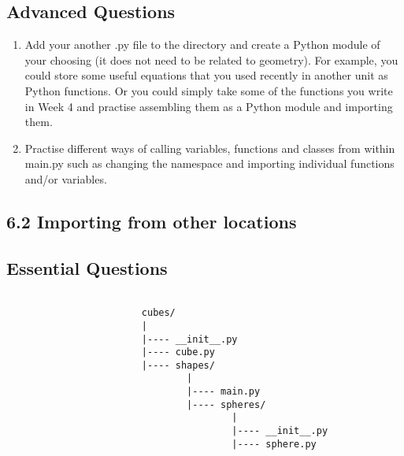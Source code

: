 \documentclass[11pt]{report}
\begin{document}
\subsection*{Advanced Questions}

\begin{enumerate}[label=(\Alph*)]
    
    \item Add your another .py file to the directory and create a Python module of your choosing (it does not need to be related to geometry). For example, you could store some useful equations that you used recently in another unit as Python functions. Or you could simply take some of the functions you write in Week 4 and practise assembling them as a Python module and importing them.  
    \item Practise different ways of calling variables, functions and classes from within main.py such as changing the namespace and importing individual functions and/or variables. 
    
\end{enumerate}

\pagebreak

\subsection*{\Large 6.2 Importing from other locations}

\subsection*{Essential Questions}

\begin{verbatim}

                        cubes/
                        |
                        |---- __init__.py
                        |---- cube.py
                        |---- shapes/
                                |
                                |---- main.py
                                |---- spheres/
                                        |
                                        |---- __init__.py
                                        |---- sphere.py
                                        
\end{verbatim}

\end{document}
